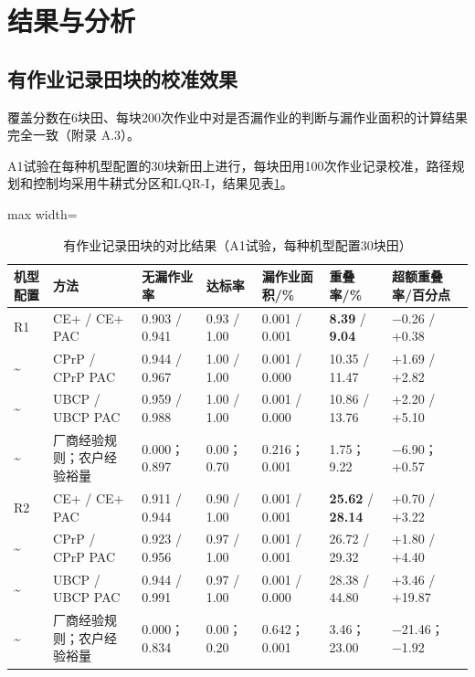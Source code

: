 \documentclass[preprint,12pt,number,sort&compress]{elsarticle}
\begin{document}
\section{结果与分析}

\subsection{有作业记录田块的校准效果}

覆盖分数在6块田、每块200次作业中对是否漏作业的判断与漏作业面积的计算结果完全一致（附录 A.3）。

A1试验在每种机型配置的30块新田上进行，每块田用100次作业记录校准，路径规划和控制均采用牛耕式分区和LQR-I，结果见表\ref{tab:4}。

\begin{table}[H]
\centering
\footnotesize
\caption{有作业记录田块的对比结果（A1试验，每种机型配置30块田）}\label{tab:4}
\begin{adjustbox}{max width=\textwidth}
\begin{tabular}{@{}l>{\raggedright\arraybackslash}p{13.5em}llll>{\raggedright\arraybackslash}p{7.3em}@{}}
\toprule
\textbf{机型配置} & \textbf{方法} & \textbf{无漏作业率} & \textbf{达标率} & \textbf{漏作业面积/\%} & \textbf{重叠率/\%} & \textbf{超额重叠率/百分点} \\
\midrule
R1 & CE+ / CE+ PAC & 0.903 / 0.941 & 0.93 / 1.00 & 0.001 / 0.001 & \textbf{8.39} / \textbf{9.04} & −0.26 / +0.38 \\
\textasciitilde{} & CPrP / CPrP PAC & 0.944 / 0.967 & 1.00 / 1.00 & 0.001 / 0.000 & 10.35 / 11.47 & +1.69 / +2.82 \\
\textasciitilde{} & UBCP / UBCP PAC & 0.959 / 0.988 & 1.00 / 1.00 & 0.001 / 0.000 & 10.86 / 13.76 & +2.20 / +5.10 \\
\textasciitilde{} & 厂商经验规则；农户经验裕量 & 0.000；0.897 & 0.00；0.70 & 0.216；0.001 & 1.75；9.22 & −6.90；+0.57 \\
R2 & CE+ / CE+ PAC & 0.911 / 0.944 & 0.90 / 1.00 & 0.001 / 0.001 & \textbf{25.62} / \textbf{28.14} & +0.70 / +3.22 \\
\textasciitilde{} & CPrP / CPrP PAC & 0.923 / 0.956 & 0.97 / 1.00 & 0.001 / 0.001 & 26.72 / 29.32 & +1.80 / +4.40 \\
\textasciitilde{} & UBCP / UBCP PAC & 0.944 / 0.991 & 0.97 / 1.00 & 0.001 / 0.000 & 28.38 / 44.80 & +3.46 / +19.87 \\
\textasciitilde{} & 厂商经验规则；农户经验裕量 & 0.000；0.834 & 0.00；0.20 & 0.642；0.001 & 3.46；23.00 & −21.46；−1.92 \\

\end{tabular}
\end{adjustbox}
\end{table}
\end{document}
